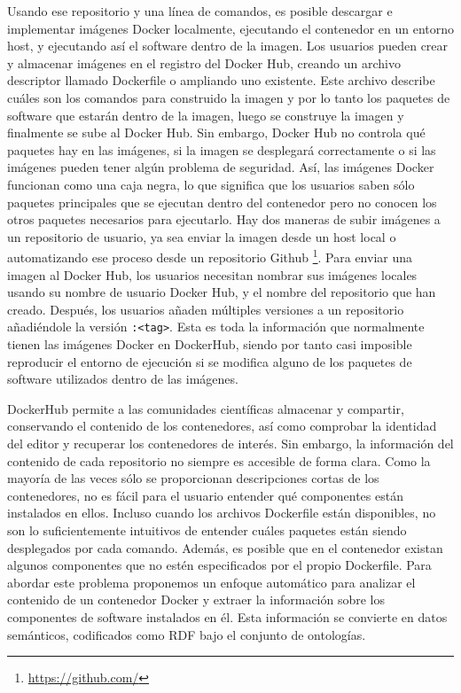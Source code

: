 Usando ese repositorio y una línea de comandos, es posible descargar e implementar imágenes Docker localmente, ejecutando el contenedor en un entorno host, y ejecutando así el software dentro de la imagen. Los usuarios pueden crear y almacenar imágenes en el registro del Docker Hub, creando un archivo descriptor llamado Dockerfile o ampliando uno existente.  Este archivo describe cuáles son los comandos para construido la imagen y por lo tanto los paquetes de software que estarán dentro de la imagen, luego se construye la imagen y finalmente se sube al Docker Hub. Sin embargo, Docker Hub no controla qué paquetes hay en las imágenes, si la imagen se desplegará correctamente o si las imágenes pueden tener algún problema de seguridad. 
Así, las imágenes Docker funcionan como una caja negra, lo que significa que los usuarios saben sólo paquetes principales que se ejecutan dentro del contenedor pero no conocen los otros paquetes necesarios para ejecutarlo.
Hay dos maneras de subir imágenes a un repositorio de usuario, ya sea enviar la imagen desde un host local o automatizando ese proceso desde un repositorio Github \footnote{\url{https://github.com/}}. Para enviar una imagen al Docker Hub, los usuarios necesitan nombrar sus imágenes locales usando su nombre de usuario Docker Hub, y el nombre del repositorio que han creado. 
Después, los usuarios añaden múltiples versiones a un repositorio añadiéndole la versión \texttt{:<tag>}. 
Esta es toda la información que normalmente tienen las imágenes Docker en DockerHub, siendo por tanto casi imposible reproducir el entorno de ejecución si se modifica alguno de los paquetes de software utilizados dentro de las imágenes. 
 
DockerHub permite a las comunidades científicas almacenar y compartir, conservando el contenido de los contenedores, así como comprobar la identidad del editor y recuperar los contenedores de interés. Sin embargo, la información del contenido de cada repositorio no siempre es accesible de forma clara. 
Como la mayoría de las veces sólo se proporcionan descripciones cortas de los contenedores, no es fácil para el usuario entender qué componentes están instalados en ellos. 
Incluso cuando los archivos Dockerfile están disponibles, no son lo suficientemente intuitivos de entender cuáles paquetes están siendo desplegados por cada comando.
Además, es posible que en el contenedor existan algunos componentes que no estén especificados por el propio Dockerfile. Para abordar este problema proponemos un enfoque automático para analizar el contenido de un contenedor Docker y extraer la información sobre los componentes de software instalados en él. Esta información se convierte en datos semánticos, codificados como RDF bajo el conjunto de ontologías.

